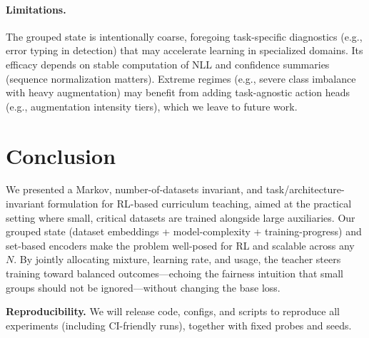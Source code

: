 \documentclass[11pt]{article}
\newcommand{\1}{\mathbf{1}}
\begin{document}
\paragraph{Limitations.}
The grouped state is intentionally coarse, foregoing task-specific diagnostics (e.g., error typing in detection) that may accelerate learning in specialized domains. Its efficacy depends on stable computation of NLL and confidence summaries (sequence normalization matters). Extreme regimes (e.g., severe class imbalance with heavy augmentation) may benefit from adding task-agnostic action heads (e.g., augmentation intensity tiers), which we leave to future work.

\section{Conclusion}
We presented a Markov, number-of-datasets invariant, and task/architecture-invariant formulation for RL-based curriculum teaching, aimed at the practical setting where small, critical datasets are trained alongside large auxiliaries. Our grouped state (dataset embeddings + model-complexity + training-progress) and set-based encoders make the problem well-posed for RL and scalable across any $N$. By jointly allocating mixture, learning rate, and usage, the teacher steers training toward balanced outcomes—echoing the fairness intuition that small groups should not be ignored—without changing the base loss. 

\medskip
\noindent\textbf{Reproducibility.}
We will release code, configs, and scripts to reproduce all experiments (including CI-friendly runs), together with fixed probes and seeds.
\end{document}
